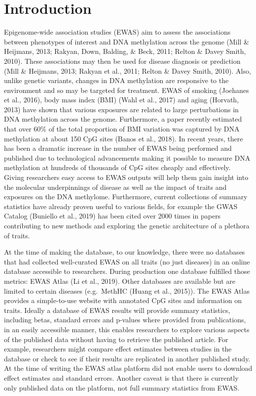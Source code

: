 \documentclass[11pt,twoside]{bristolthesis}
\begin{document}
\hypertarget{introduction-1}{%
\section{Introduction}\label{introduction-1}}

Epigenome-wide association studies (EWAS) aim to assess the associations between phenotypes of interest and DNA methylation across the genome (Mill \& Heijmans, 2013; Rakyan, Down, Balding, \& Beck, 2011; Relton \& Davey Smith, 2010). These associations may then be used for disease diagnosis or prediction (Mill \& Heijmans, 2013; Rakyan et al., 2011; Relton \& Davey Smith, 2010). Also, unlike genetic variants, changes in DNA methylation are responsive to the environment and so may be targeted for treatment. EWAS of smoking (Joehanes et al., 2016), body mass index (BMI) (Wahl et al., 2017) and aging (Horvath, 2013) have shown that various exposures are related to large perturbations in DNA methylation across the genome. Furthermore, a paper recently estimated that over 60\% of the total proportion of BMI variation was captured by DNA methylation at about 150 CpG sites (Banos et al., 2018). In recent years, there has been a dramatic increase in the number of EWAS being performed and published due to technological advancements making it possible to measure DNA methylation at hundreds of thousands of CpG sites cheaply and effectively. Giving researchers easy access to EWAS outputs will help them gain insight into the molecular underpinnings of disease as well as the impact of traits and exposures on the DNA methylome. Furthermore, current collections of summary statistics have already proven useful to various fields, for example the GWAS Catalog (Buniello et al., 2019) has been cited over 2000 times in papers contributing to new methods and exploring the genetic architecture of a plethora of traits.

At the time of making the database, to our knowledge, there were no databases that had collected well-curated EWAS on all traits (no just diseases) in an online database accessible to researchers. During production one database fulfilled those metrics: EWAS Atlas (Li et al., 2019). Other databases are available but are limited to certain diseases (e.g.~MethHC (Huang et al., 2015)). The EWAS Atlas provides a simple-to-use website with annotated CpG sites and information on traits. Ideally a database of EWAS results will provide summary statistics, including betas, standard errors and p-values where provided from publications, in an easily accessible manner, this enables researchers to explore various aspects of the published data without having to retrieve the published article. For example, researchers might compare effect estimates between studies in the database or check to see if their results are replicated in another published study. At the time of writing the EWAS atlas platform did not enable users to download effect estimates and standard errors. Another caveat is that there is currently only published data on the platform, not full summary statistics from EWAS.
\end{document}
